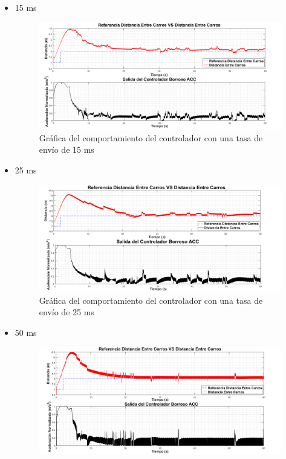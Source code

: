 \begin{itemize}
\begin{figure}[H]
		\label{fig:cv10}
\end{figure}	
\item 15 ms
\begin{figure}[H]
	\centering
		\includegraphics[scale=0.48]{Imagenes/15cv}
		\caption{Gráfica del comportamiento del controlador con una tasa de envío de 15 ms}
		\label{fig:cv15}
\end{figure}	
\item 25 ms
\begin{figure}[H]
	\centering
		\includegraphics[scale=0.49]{Imagenes/25cv}
		\caption{Gráfica del comportamiento del controlador con una tasa de envío de 25 ms}
		\label{fig:cv25}
\end{figure}	
\item 50 ms
\begin{figure}[H]
	\centering
		\includegraphics[scale=0.48]{Imagenes/50sv}

\end{figure}
\end{itemize}

